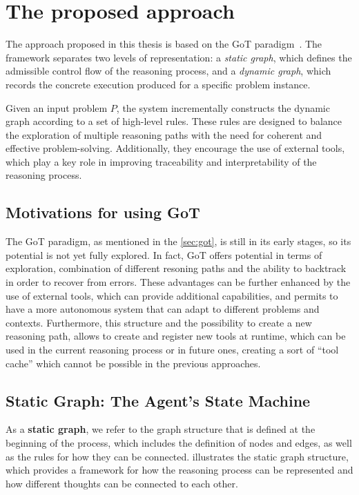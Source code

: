 \documentclass[12pt,a4paper,openright,twoside]{book}
\begin{document}
\section{The proposed approach}
The approach proposed in this thesis is based on the \ac{GoT} paradigm~\cite{besta2024got}. 
The framework separates two levels of representation: a \textit{static graph}, which defines the admissible control flow of the
reasoning process, and a \textit{dynamic graph}, which records the concrete execution
produced for a specific problem instance.

Given an input problem $P$, the system incrementally constructs the dynamic graph according to a set of high-level rules. 
These rules are designed to balance the exploration of multiple reasoning paths with the need for coherent and effective problem-solving. Additionally, they encourage the use of external tools, which play a key role in improving traceability and interpretability of the reasoning process.

\subsection{Motivations for using GoT}
The \ac{GoT} paradigm, as mentioned in the \cref{sec:got}, is still in its early stages, so its potential is not yet fully explored.
%
In fact, \ac{GoT} offers potential in terms of exploration, combination of different resoning paths and the ability to backtrack in order to recover from errors. 
These advantages can be further enhanced by the use of external tools, which can provide additional capabilities, and permits to have a more autonomous system that can adapt to different problems and contexts.
Furthermore, this structure and the possibility to create a new reasoning path, allows to create and register new tools at runtime, which can be used in the current reasoning process or in future ones, creating a sort of ``tool cache'' which cannot be possible in the previous approaches.  

\subsection{Static Graph: The Agent's State Machine}
As a \textbf{static graph}, we refer to the graph structure that is defined at the beginning of the process, which includes the definition of nodes and edges, as well as the rules for how they can be connected. 
 illustrates the static graph structure, which provides a framework for how the reasoning process can be represented and how different thoughts can be connected to each other.
\end{document}
